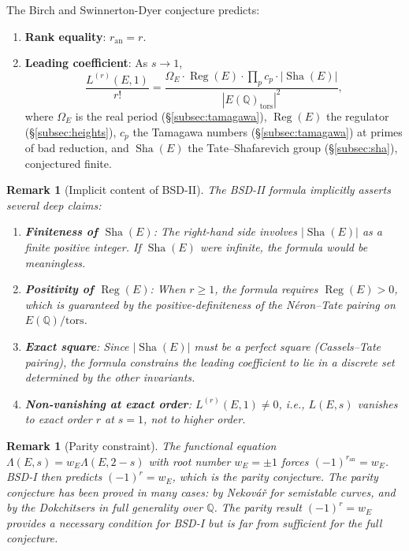 \documentclass[11pt]{article}
\newtheorem{remark}[theorem]{Remark}
\DeclareMathOperator{\Reg}{Reg}
\DeclareMathOperator{\Sha}{Sha}
\begin{document}
The Birch and Swinnerton-Dyer conjecture \cite{BSD} predicts:
\begin{enumerate}
  \item[(BSD-I)] \textbf{Rank equality}: $r_{\mathrm{an}} = r$.
  \item[(BSD-II)] \textbf{Leading coefficient}: As $s \to 1$,
    \[
      \frac{L^{(r)}(E,1)}{r!} =
      \frac{\Omega_E \cdot \Reg(E) \cdot \prod_p c_p \cdot |\Sha(E)|}
           {|E(\mathbb{Q})_{\mathrm{tors}}|^2},
    \]
    where $\Omega_E$ is the real period (\S\ref{subsec:tamagawa}), $\Reg(E)$
    the regulator (\S\ref{subsec:heights}), $c_p$ the Tamagawa numbers
    (\S\ref{subsec:tamagawa}) at primes of bad reduction, and $\Sha(E)$ the
    Tate--Shafarevich group (\S\ref{subsec:sha}), conjectured finite.
\end{enumerate}

\begin{remark}[Implicit content of BSD-II]
The BSD-II formula implicitly asserts several deep claims:
\begin{enumerate}
  \item \textbf{Finiteness of $\Sha(E)$}: The right-hand side involves
    $|\Sha(E)|$ as a finite positive integer.  If $\Sha(E)$ were infinite,
    the formula would be meaningless.
  \item \textbf{Positivity of $\Reg(E)$}: When $r \geq 1$, the formula
    requires $\Reg(E) > 0$, which is guaranteed by the positive-definiteness
    of the N\'eron--Tate pairing on $E(\mathbb{Q})/\mathrm{tors}$.
  \item \textbf{Exact square}: Since $|\Sha(E)|$ must be a perfect square
    (Cassels--Tate pairing), the formula constrains the leading coefficient
    to lie in a discrete set determined by the other invariants.
  \item \textbf{Non-vanishing at exact order}: $L^{(r)}(E,1) \neq 0$, i.e.,
    $L(E,s)$ vanishes to \emph{exact} order $r$ at $s = 1$, not to higher
    order.
\end{enumerate}
\end{remark}

\begin{remark}[Parity constraint]
The functional equation $\Lambda(E,s) = w_E \Lambda(E,2-s)$ with root number
$w_E = \pm 1$ forces $(-1)^{r_{\mathrm{an}}} = w_E$.  BSD-I then predicts
$(-1)^r = w_E$, which is the \emph{parity conjecture}.  The parity conjecture
has been proved in many cases: by Nekov\'a\v{r} \cite{Nek} for semistable
curves, and by the Dokchitsers \cite{DD} in full generality over $\mathbb{Q}$.
The parity result $(-1)^r = w_E$ provides a necessary condition for BSD-I but
is far from sufficient for the full conjecture.
\end{remark}
\end{document}
